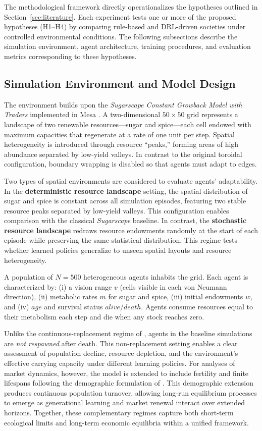 \documentclass[pdflatex,sn-mathphys-num]{sn-jnl}%
\theoremstyle{thmstyleone}%
\theoremstyle{thmstyletwo}%
\theoremstyle{thmstylethree}%
\begin{document}
The methodological framework directly operationalizes the hypotheses outlined in Section~\ref{sec:literature}.  
Each experiment tests one or more of the proposed hypotheses (H1--H4) by comparing rule-based and DRL-driven societies under controlled environmental conditions.  
The following subsections describe the simulation environment, agent architecture, training procedures, and evaluation metrics corresponding to these hypotheses.

\subsection{Simulation Environment and Model Design}
The environment builds upon the \textit{Sugarscape Constant Growback Model with Traders} implemented in Mesa \citep{Mesa2025}.  
A two-dimensional \(50\times50\) grid represents a landscape of two renewable resources---sugar and spice---each cell endowed with maximum capacities that regenerate at a rate of one unit per step.  
Spatial heterogeneity is introduced through resource ``peaks,'' forming areas of high abundance separated by low-yield valleys.  
In contrast to the original toroidal configuration, boundary wrapping is disabled so that agents must adapt to edges.

Two types of spatial environments are considered to evaluate agents' adaptability.  
In the \textbf{deterministic resource landscape} setting, the spatial distribution of sugar and spice is constant across all simulation episodes, featuring two stable resource peaks separated by low-yield valleys.  
This configuration enables comparison with the classical \textit{Sugarscape} baseline.  
In contrast, the \textbf{stochastic resource landscape} redraws resource endowments randomly at the start of each episode while preserving the same statistical distribution.  
This regime tests whether learned policies generalize to unseen spatial layouts and resource heterogeneity.

A population of \(N=500\) heterogeneous agents inhabits the grid.  
Each agent is characterized by:  
(i) a vision range \(v\) (cells visible in each von Neumann direction),  
(ii) metabolic rates \(m\) for sugar and spice,  
(iii) initial endowments \(w\), and
(iv) \(age\) and survival status \(alive\)/\(death\).  
Agents consume resources equal to their metabolism each step and die when any stock reaches zero.  

Unlike the continuous-replacement regime of \citet{EpsteinAxtell1996}, agents in the baseline simulations are \textit{not respawned} after death.  
This non-replacement setting enables a clear assessment of population decline, resource depletion, and the environment's effective carrying capacity under different learning policies.
For analyses of market dynamics, however, the model is extended to include fertility and finite lifespans following the demographic formulation of \citet{EpsteinAxtell1996}.  
This demographic extension produces continuous population turnover, allowing long-run equilibrium processes to emerge as generational learning and market renewal interact over extended horizons.  
Together, these complementary regimes capture both short-term ecological limits and long-term economic equilibria within a unified framework.
\end{document}
